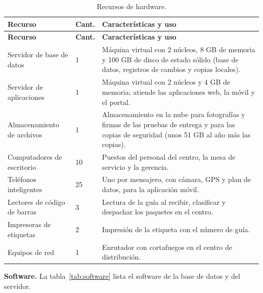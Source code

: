 {\singlespacing\small
\begin{longtable}{L{3.4cm} L{1.4cm} L{9.6cm}}
\caption{Recursos de hardware.}
\label{tab:hardware}\\
\toprule
\textbf{Recurso} & \textbf{Cant.} & \textbf{Características y uso} \\
\midrule
\endfirsthead
\toprule
\textbf{Recurso} & \textbf{Cant.} & \textbf{Características y uso} \\
\midrule
\endhead
\bottomrule
\endfoot
Servidor de base de datos & 1 & Máquina virtual con 2 núcleos, 8 GB de memoria y 100 GB de disco de estado sólido (base de datos, registros de cambios y copias locales). \\
Servidor de aplicaciones & 1 & Máquina virtual con 2 núcleos y 4 GB de memoria; atiende las aplicaciones web, la móvil y el portal. \\
Almacenamiento de archivos & 1 & Almacenamiento en la nube para fotografías y firmas de las pruebas de entrega y para las copias de seguridad (unos 51 GB al año más las copias). \\
Computadores de escritorio & 10 & Puestos del personal del centro, la mesa de servicio y la gerencia. \\
Teléfonos inteligentes & 25 & Uno por mensajero, con cámara, GPS y plan de datos, para la aplicación móvil. \\
Lectores de código de barras & 3 & Lectura de la guía al recibir, clasificar y despachar los paquetes en el centro. \\
Impresoras de etiquetas & 2 & Impresión de la etiqueta con el número de guía. \\
Equipos de red & 1 & Enrutador con cortafuegos en el centro de distribución. \\
\end{longtable}
\par}

\textbf{Software.} La tabla~\ref{tab:software} lista el software de la
base de datos y del servidor.

